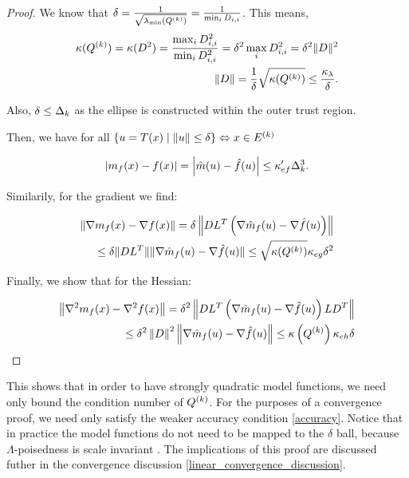 \begin{proof}


We know that $\delta = \frac 1 {\sqrt{\lambda_{\text{min}}({Q^{(k)}})}} = \frac 1 {\min_{i} D_{i, i}}$.
This means,
\begin{align*}
\kappa({Q^{(k)}}) = \kappa(D^2) = \frac{\max_{i}D_{i,i}^2}{\min_{i}D_{i,i}^2} = \delta^2 \max_{i}D_{i,i}^2 = \delta^2 \|D\|^2 \\
\|D\| = \frac 1 {\delta} \sqrt{\kappa({Q^{(k)}})} \le \frac{\kappa_{\lambda}}{\delta}.
\end{align*}

Also, $\delta \le \Delta_k$ as the ellipse is constructed within the outer trust region.

Then, we have for all $\left\{u = T(x) \; | \; \|u\| \le \delta \right\} \Leftrightarrow x \in {E^{(k)}}$

\begin{align*}
\left| m_f(x) - f(x)\right| = \left|\hat m(u) - \hat f(u)\right| \le \kappa_{ef}'\Delta_k^3.
\end{align*}

Similarily, for the gradient we find:

\begin{align*}
\| \nabla m_f(x) - \nabla f(x)\| = \delta\left\|DL^T\left(\nabla\hat m_f(u) - \nabla \hat f(u)\right)\right\| \\
\le \delta \|DL^T\|\|\nabla \hat m_f(u) - \nabla \hat f(u)\| 
\le \sqrt{\kappa({Q^{(k)}})}\kappa_{eg} \delta^2
\end{align*}

Finally, we show that for the Hessian:

\begin{align*}
\left\| \nabla^2 m_f(x) - \nabla^2 f(x)\right\| = \delta^2\left\|DL^T\left(\nabla\hat m_f(u) - \nabla \hat f(u)\right)LD^T\right\| \\
\le \delta^2 \left\|D\right\|^2\left\|\nabla \hat m_f(u) - \nabla \hat f(u)\right\| \le \kappa\left({Q^{(k)}}\right)\kappa_{eh} \delta
\end{align*}

\end{proof}

This shows that in order to have strongly quadratic model functions, we need only bound the condition number of ${Q^{(k)}}$.
For the purposes of a convergence proof, we need only satisfy the weaker accuracy condition \cref{accuracy}.
Notice that in practice the model functions do not need to be mapped to the $\delta$ ball, because $\Lambda$-poisedness is scale invariant \cite{introduction_book}.
The implications of this proof are discussed futher in the convergence discussion \cref{linear_convergence_discussion}.


